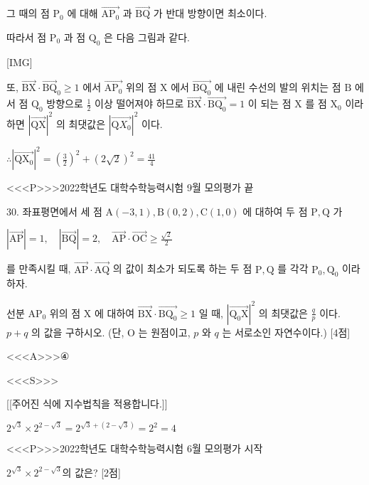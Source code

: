 \documentclass{oblivoir}
\begin{document}
그 때의 점 $\mathrm{P}_{0}$ 에 대해 $\overrightarrow{\mathrm{AP}_{0}}$ 과 $\overrightarrow{\mathrm{BQ}}$ 가 반대 방향이면 최소이다.

따라서 점 $\mathrm{P}_{0}$ 과 점 $\mathrm{Q}_{0}$ 은 다음 그림과 같다.

[IMG]

또, $\overrightarrow{\mathrm{BX}} \cdot \overrightarrow{\mathrm{BQ}}_{0} \geq 1$ 에서 $\overrightarrow{\mathrm{AP}_{0}}$ 위의 점 $\mathrm{X}$ 에서 $\overrightarrow{\mathrm{BQ}_{0}}$ 에 내린 수선의 발의 위치는 점 $\mathrm{B}$ 에서 점 $\mathrm{Q}_{0}$ 방향으로 $\frac{1}{2}$ 이상 떨어져야 하므로
$\overrightarrow{\mathrm{BX}} \cdot \overrightarrow{\mathrm{BQ}_{0}}=1$ 이 되는 점 $\mathrm{X}$ 를 점 $\mathrm{X}_{0}$ 이라 하면 $|\overrightarrow{\mathrm{QX}}|^{2}$ 의 최댓값은 $\left|\overrightarrow{\mathrm{Q} X_{0}}\right|^{2}$ 이다.

$\therefore\left|\overrightarrow{\mathrm{Q} \mathrm{X}_{0}}\right|^{2}=\left(\frac{3}{2}\right)^{2}+(2 \sqrt{2})^{2}=\frac{41}{4}$


<<<P>>>2022학년도 대학수학능력시험 9월 모의평가 끝

30. 좌표평면에서 세 점 $\mathrm{A}(-3,1), \mathrm{B}(0,2), \mathrm{C}(1,0)$ 에 대하여 두 점 $\mathrm{P}, \mathrm{Q}$ 가

$|\overrightarrow{\mathrm{AP}}|=1, \quad|\overrightarrow{\mathrm{BQ}}|=2, \quad \overrightarrow{\mathrm{AP}} \cdot \overrightarrow{\mathrm{OC}} \geq \frac{\sqrt{2}}{2}$

를 만족시킬 때, $\overrightarrow{\mathrm{AP}} \cdot \overrightarrow{\mathrm{AQ}}$ 의 값이 최소가 되도록 하는 두 점 $\mathrm{P}, \mathrm{Q}$ 를 각각 $\mathrm{P}_{0}, \mathrm{Q}_{0}$ 이라 하자.

선분 $\mathrm{AP}_{0}$ 위의 점 $\mathrm{X}$ 에 대하여 $\overrightarrow{\mathrm{BX}} \cdot \overrightarrow{\mathrm{BQ}_{0}} \geq 1$ 일 때, $\left|\overrightarrow{\mathrm{Q}_{0} \mathrm{X}}\right|^{2}$ 의 최댓값은 $\frac{q}{p}$ 이다. $p+q$ 의 값을 구하시오. (단, $\mathrm{O}$ 는 원점이고, $p$ 와 $q$ 는 서로소인 자연수이다.) [4점]




<<<A>>>④

<<<S>>>

[[주어진 식에 지수법칙을 적용합니다.]]

$2^{\sqrt{3}}\times 2^{2-\sqrt{3}}$$=2^{\sqrt{3}+(2-\sqrt{3})}$$=2^{2}$$=4$

<<<P>>>2022학년도 대학수학능력시험 6월 모의평가 시작

$2^{\sqrt{3}}\times 2^{2-\sqrt{3}}$의 값은? [2점]
\end{document}
